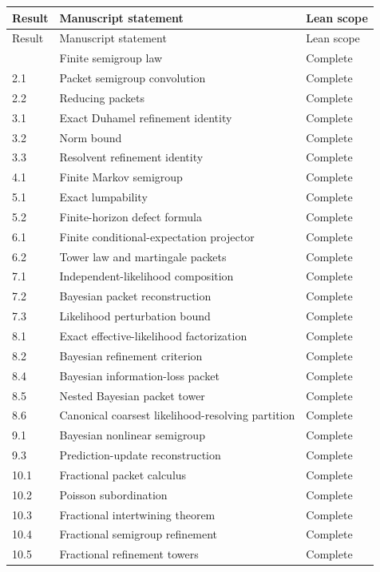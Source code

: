 \documentclass[11pt,a4paper]{article}
\theoremstyle{definition}
\theoremstyle{remark}
\begin{document}
\small
\begin{longtable}{@{}p{}p{}p{}@{}}
\toprule Result & Manuscript statement & Lean scope\\
\midrule\endfirsthead
\toprule Result & Manuscript statement & Lean scope\\\midrule\endhead
\bottomrule\endfoot
1.2 & Finite semigroup law & Complete\\
2.1 & Packet semigroup convolution & Complete\\
2.2 & Reducing packets & Complete\\
3.1 & Exact Duhamel refinement identity & Complete\\
3.2 & Norm bound & Complete\\
3.3 & Resolvent refinement identity & Complete\\
4.1 & Finite Markov semigroup & Complete\\
5.1 & Exact lumpability & Complete\\
5.2 & Finite-horizon defect formula & Complete\\
6.1 & Finite conditional-expectation projector & Complete\\
6.2 & Tower law and martingale packets & Complete\\
7.1 & Independent-likelihood composition & Complete\\
7.2 & Bayesian packet reconstruction & Complete\\
7.3 & Likelihood perturbation bound & Complete\\
8.1 & Exact effective-likelihood factorization & Complete\\
8.2 & Bayesian refinement criterion & Complete\\
8.4 & Bayesian information-loss packet & Complete\\
8.5 & Nested Bayesian packet tower & Complete\\
8.6 & Canonical coarsest likelihood-resolving partition & Complete\\
9.1 & Bayesian nonlinear semigroup & Complete\\
9.3 & Prediction-update reconstruction & Complete\\
10.1 & Fractional packet calculus & Complete\\
10.2 & Poisson subordination & Complete\\
10.3 & Fractional intertwining theorem & Complete\\
10.4 & Fractional semigroup refinement & Complete\\
10.5 & Fractional refinement towers & Complete\\

\end{longtable}
\end{document}
